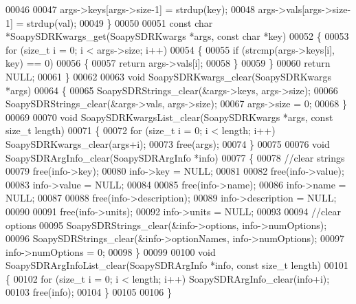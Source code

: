\begin{DoxyCode}
00046 
00047     args->keys[args->size-1] = strdup(key);
00048     args->vals[args->size-1] = strdup(val);
00049 \}
00050 
00051 \textcolor{keyword}{const} \textcolor{keywordtype}{char} *SoapySDRKwargs_get(SoapySDRKwargs *args, \textcolor{keyword}{const} \textcolor{keywordtype}{char} *key)
00052 \{
00053     \textcolor{keywordflow}{for} (\textcolor{keywordtype}{size\_t} i = 0; i < args->size; i++)
00054     \{
00055         \textcolor{keywordflow}{if} (strcmp(args->keys[i], key) == 0)
00056         \{
00057             \textcolor{keywordflow}{return} args->vals[i];
00058         \}
00059     \}
00060     \textcolor{keywordflow}{return} NULL;
00061 \}
00062 
00063 \textcolor{keywordtype}{void} SoapySDRKwargs_clear(SoapySDRKwargs *args)
00064 \{
00065     SoapySDRStrings_clear(&args->keys, args->size);
00066     SoapySDRStrings_clear(&args->vals, args->size);
00067     args->size = 0;
00068 \}
00069 
00070 \textcolor{keywordtype}{void} SoapySDRKwargsList_clear(SoapySDRKwargs *args, \textcolor{keyword}{const} \textcolor{keywordtype}{size\_t} length)
00071 \{
00072     \textcolor{keywordflow}{for} (\textcolor{keywordtype}{size\_t} i = 0; i < length; i++) SoapySDRKwargs_clear(args+i);
00073     free(args);
00074 \}
00075 
00076 \textcolor{keywordtype}{void} SoapySDRArgInfo_clear(SoapySDRArgInfo *info)
00077 \{
00078     \textcolor{comment}{//clear strings}
00079     free(info->key);
00080     info->key = NULL;
00081 
00082     free(info->value);
00083     info->value = NULL;
00084 
00085     free(info->name);
00086     info->name = NULL;
00087 
00088     free(info->description);
00089     info->description = NULL;
00090 
00091     free(info->units);
00092     info->units = NULL;
00093 
00094     \textcolor{comment}{//clear options}
00095     SoapySDRStrings_clear(&info->options, info->numOptions);
00096     SoapySDRStrings_clear(&info->optionNames, info->numOptions);
00097     info->numOptions = 0;
00098 \}
00099 
00100 \textcolor{keywordtype}{void} SoapySDRArgInfoList_clear(SoapySDRArgInfo *info, \textcolor{keyword}{const} \textcolor{keywordtype}{size\_t} length)
00101 \{
00102     \textcolor{keywordflow}{for} (\textcolor{keywordtype}{size\_t} i = 0; i < length; i++) SoapySDRArgInfo_clear(info+i);
00103     free(info);
00104 \}
00105 
00106 \}
\end{DoxyCode}
